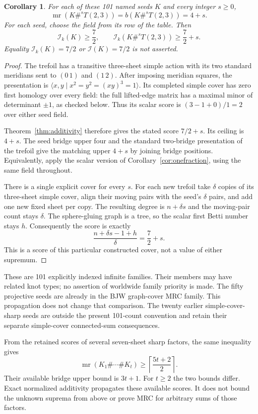 \documentclass[11pt]{article}
\newtheorem{corollary}[theorem]{Corollary}
\newcommand{\mr}{\operatorname{mr}}
\newcommand{\I}{\mathcal I}
\begin{document}
\begin{corollary}\label{cor:hundredone}
For each of these 101 named seeds $K$ and every integer $s\ge0$,
\[
                  \mr(K\#^{s}T(2,3))
                    =b(K\#^{s}T(2,3))=4+s.
\]
For each seed, choose the field from its row of the table. Then
\[
        \I_k(K)\ge\frac72,\qquad
        \I_k(K\#^{s}T(2,3))\ge\frac72+s.
\]
Equality $\I_k(K)=7/2$ or $\I(K)=7/2$ is not asserted.
\end{corollary}
\begin{proof}
The trefoil has a transitive three-sheet simple action with its two
standard meridians sent to $(0\,1)$ and $(1\,2)$.
After imposing meridian squares, the presentation is
$\langle x,y\mid x^2=y^2=(xy)^3=1\rangle$.
Its completed simple cover has zero first homology over every field:
the full lifted-edge matrix has a maximal minor of determinant
$\pm1$, as checked below. Thus its scalar score is
$(3-1+0)/1=2$ over either seed field.

Theorem~\ref{thm:additivity} therefore gives the stated score
$7/2+s$. Its ceiling is $4+s$.
The seed bridge upper four and the standard two-bridge presentation
of the trefoil give the matching upper $4+s$ by joining bridge positions.
Equivalently, apply the scalar version of
Corollary~\ref{cor:onefraction}, using the same field throughout.

There is a single explicit cover for every $s$.
For each new trefoil take $\delta$ copies of its three-sheet simple
cover, align their moving pairs with the seed's $\delta$ pairs,
and add one new fixed sheet per copy. The resulting degree is
$n+\delta s$ and the moving-pair count stays $\delta$.
The sphere-gluing graph is a tree, so the scalar first Betti number
stays $h$. Consequently the score is exactly
\[
                  \frac{n+\delta s-1+h}{\delta}
                       =\frac72+s.
\]
This is a score of this particular constructed cover, not a value
of either supremum.
\end{proof}

These are 101 explicitly indexed infinite families. Their members may
have related knot types; no assertion of worldwide family priority is
made. The fifty projective seeds are already in the BJW graph-cover
MRC family. This propagation does not change that comparison.
The twenty earlier simple-cover-sharp seeds are outside the present
101-count convention and retain their separate simple-cover
connected-sum consequences.

From the retained scores of several seven-sheet sharp factors,
the same inequality gives
\[
       \mr(K_1\#\cdots\#K_t)
                    \ge\left\lceil\frac{5t+2}{2}\right\rceil.
\]
Their available bridge upper bound is $3t+1$. For $t\ge2$ the two
bounds differ. Exact normalized additivity propagates these available
scores. It does not bound the unknown suprema from above or prove
MRC for arbitrary sums of those factors.
\end{document}
